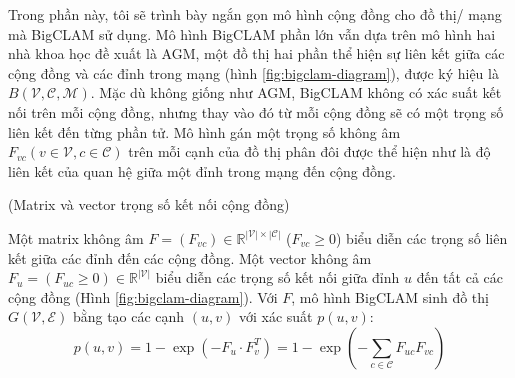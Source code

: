Trong phần này, tôi sẽ trình bày ngắn gọn mô hình cộng đồng cho đồ thị/ mạng mà BigCLAM sử dụng. Mô hình BigCLAM phần lớn vẫn dựa trên mô hình hai nhà khoa học đề xuất là AGM, một đồ thị hai phần thể hiện sự liên kết giữa các cộng đồng và các đỉnh trong mạng (hình \ref{fig:bigclam-diagram}), được ký hiệu là $B(\mathcal{V},\mathcal{C},\mathcal{M})$. Mặc dù không giống như AGM, BigCLAM không có xác suất kết nối trên mỗi cộng đồng, nhưng thay vào đó từ mỗi cộng đồng sẽ có một trọng số liên kết đến từng phần tử. Mô hình gán một trọng số không âm $F_{vc}(v \in \mathcal{V}, c \in \mathcal{C})$ trên mỗi cạnh của đồ thị phân đôi được thể hiện như là độ liên kết của quan hệ giữa một đỉnh trong mạng đến cộng đồng.
\begin{definition}(Matrix và vector trọng số kết nối cộng đồng)
	
	Một matrix không âm $F =  (F_{vc})\in \mathbb{R}^{|\mathcal{V}|\times|\mathcal{C}|}$ ($F_{vc} \geq 0$) biểu diễn các trọng số liên kết giữa các đỉnh đến các cộng đồng. Một vector không âm $F_u =  (F_{uc} \geq 0)\in \mathbb{R}^{|\mathcal{V}|}$ biểu diễn các trọng số kết nối giữa đỉnh $u$ đến tất cả các cộng đồng (Hình \ref{fig:bigclam-diagram}). Với $F$, mô hình BigCLAM sinh đồ thị $G(\mathcal{V}, \mathcal{E})$ bằng tạo các cạnh $(u,v)$ với xác suất $p\left(u,v\right)$:
	\begin{equation}\label{eq:p_uv}
		p\left(u,v\right) = 1 -\exp(-F_u\cdot F_v^T) = 1 - \exp\left(-\sum_{c\in \mathcal{C}}{F_{uc}F_{vc}}\right)
	\end{equation}
\end{definition}

